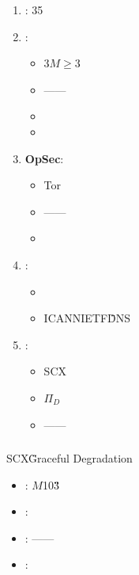 \documentclass[12pt,a4paper]{article}
\theoremstyle{remark}
\begin{document}
\begin{enumerate}[label=(\arabic*)]
    \item \textbf{}: 35
    
    \item \textbf{}: 
    \begin{itemize}[nosep]
        \item 3$M \geq 3$
        \item ——
        \item 
        \item 
    \end{itemize}
    
    \item \textbf{OpSec}: 
    \begin{itemize}[nosep]
        \item Tor
        \item ——
        \item 
    \end{itemize}
    
    \item \textbf{}: 
    \begin{itemize}[nosep]
        \item 
        \item ICANNIETF\"\"DNS
    \end{itemize}
    
    \item \textbf{}: 
    \begin{itemize}[nosep]
        \item SCX
        \item $\Pi_D$
        \item ——
    \end{itemize}
\end{enumerate}

\subsubsection{}

SCX\"\"Graceful Degradation

\begin{itemize}[nosep]
    \item \textbf{}: $M$103\"\"\"\"
    \item \textbf{}: 
    \item \textbf{}: ——
    \item \textbf{}: 
\end{itemize}

\subsubsection{}
\end{document}

